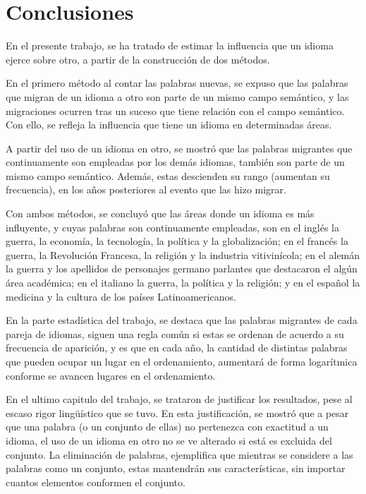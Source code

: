 \chapter{Conclusiones}

En el presente trabajo, se ha tratado de estimar  la influencia que un idioma ejerce sobre otro,  a partir de la construcción de dos métodos. 

En el primero método al contar las palabras nuevas, se expuso que las palabras que migran de un idioma a otro son parte de un mismo campo semántico, y las migraciones ocurren tras un suceso que tiene relación con el campo semántico. Con ello, se refleja la influencia que tiene un idioma en determinadas áreas.  

A partir del uso de un idioma en otro, se mostró que las palabras migrantes que continuamente son empleadas por los demás idiomas, también son parte de un mismo campo semántico. Además, estas descienden su rango (aumentan su frecuencia), en los años posteriores al evento que las hizo migrar. 

Con ambos métodos, se concluyó que las áreas donde un idioma es más influyente, y cuyas palabras son continuamente empleadas, son en el inglés la guerra, la economía, la tecnología, la política y la globalización; en el francés la guerra, la Revolución Francesa, la religión y la industria vitivinícola; en el alemán la guerra y los apellidos de personajes germano parlantes que destacaron el algún área académica; en el italiano  la guerra, la política y la religión; y en el español la medicina y la cultura de los países Latinoamericanos. 

En la parte estadística del trabajo, se destaca que las palabras migrantes de cada pareja de idiomas, siguen una regla común si estas se ordenan de acuerdo a su frecuencia de aparición, y es que en cada año, la cantidad de distintas palabras que pueden ocupar un lugar en el ordenamiento, aumentará de forma logarítmica conforme se avancen lugares en el ordenamiento. 

En el ultimo capitulo del trabajo, se trataron de justificar los resultados, pese al escaso rigor lingüístico que se tuvo. En esta justificación, se mostró que a pesar que una palabra (o un conjunto de ellas) no pertenezca con exactitud a un idioma,  el uso de un idioma en otro no se ve alterado si está es excluida del conjunto. La eliminación de palabras, ejemplifica que mientras se considere a las palabras como un conjunto,  estas mantendrán sus características, sin importar cuantos elementos conformen el conjunto. 





